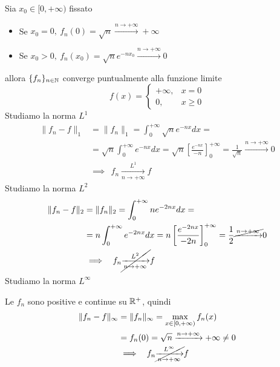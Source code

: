 Sia $x_{0} \in [ 0, + \infty)$ fissato
\begin{itemize}
\item Se $x_{0} = 0, \ f_{n}(0) = \sqrt{n}\xrightarrow{n\rightarrow + \infty} + \infty $
\item Se $x_{0}  > 0, \ f_{n}(x_{0}) = \sqrt{n} e^{- nx_{0}}\xrightarrow{n\rightarrow + \infty} 0$
\end{itemize}
allora $\{f_{n}\}_{n\in \mathbb{N}}$ converge puntualmente alla funzione limite
\begin{equation*}
f(x) = 
\begin{cases}
+ \infty, & x = 0\\
0, & x \geq 0
\end{cases}
\end{equation*}
Studiamo la norma $L^{1}$
\begin{equation*}
\begin{aligned}
\| f_{n} - f\|_{1} & = \| f_{n} \|_{1} = \int^{+ \infty}_{0}\sqrt{n} e^{- nx} dx = \\
 & = \sqrt{n}\int^{+ \infty}_{0} e^{- nx} dx = \sqrt{n}\left[\frac{e^{- nx}}{- n}\right]^{+ \infty}_{0} = \frac{1}{\sqrt{n}}\xrightarrow{n\rightarrow + \infty} 0\\
 & \implies \ \ f_{n}\xrightarrow[n\rightarrow + \infty ]{L^{1}} f
\end{aligned}
\end{equation*}
Studiamo la norma $L^{2}$
\begin{equation*}
\begin{aligned}
\| f_{n} - f\|_{2} & = \| f_{n} \|_{2} = \int^{+ \infty}_{0} ne^{- 2nx} dx = \\
 & = n\int^{+ \infty}_{0} e^{- 2nx} dx = n\left[\frac{e^{- 2nx}}{- 2n}\right]^{+ \infty}_{0} = \frac{1}{2}\cancel{\xrightarrow{n\rightarrow + \infty}} 0\\
 & \implies \ \ f_{n}\cancel{\xrightarrow[n\rightarrow + \infty ]{L^{2}}} f
\end{aligned}
\end{equation*}
Studiamo la norma $L^{\infty}$

Le $f_{n}$ sono positive e continue su $\mathbb{R}^{+}$, quindi
\begin{equation*}
\begin{aligned}
\| f_{n} - f\|_{\infty} & = \| f_{n} \|_{\infty} = \max_{x\in [ 0, + \infty)} f_{n}(x)\\
 & = f_{n}(0) = \sqrt{n}\xrightarrow{n\rightarrow + \infty} + \infty \neq 0\\
 & \implies \ \ f_{n}\cancel{\xrightarrow[n\rightarrow + \infty ]{L^{\infty}}} f
\end{aligned}
\end{equation*}
\Soluzione

